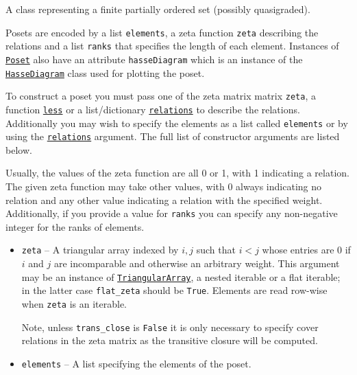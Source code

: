 \documentclass[12pt]{article}
\begin{document}
{\list{}{\leftmargin 0.5cm}\item{
A class representing a finite partially ordered set (possibly quasigraded).

Posets are encoded by a list \verb|elements|, a zeta
function \verb|zeta| describing the relations and a
list \verb|ranks| that specifies the length of each element.
Instances of \hyperlink{Poset}{\texttt{Poset}} also
have an attribute \verb|hasseDiagram| which is an instance
of the \hyperlink{HasseDiagram}{\texttt{HasseDiagram}} class used for plotting the poset.

To construct a poset you must pass one of the zeta matrix
matrix \verb|zeta|, a function \hyperlink{Poset.less}{\texttt{less}} or a list/dictionary
\hyperlink{Poset.relations}{\texttt{relations}} to describe
the relations. Additionally you may wish to specify the
elements as a list called \verb|elements| or by using
the \hyperlink{Poset.relations}{\texttt{relations}} argument. The full list of constructor
arguments are listed below.

Usually, the values of the zeta function are all 0 or 1,
with 1 indicating a relation. The given zeta function may
take other values, with 0 always indicating no relation
and any other value indicating a relation with the
specified weight. Additionally, if you provide a value
for \verb|ranks| you can specify any non-negative integer for
the ranks of elements.

\begin{itemize}
        \item[]{
        \verb|zeta| -- A triangular array indexed by $i,j$ such
        that $i<j$ whose entries are 0 if $i$ and $j$ are
        incomparable and otherwise an arbitrary weight. This
        argument may be an instance of \hyperlink{TriangularArray}{\texttt{TriangularArray}},
        a nested iterable or a flat iterable; in the latter case
        \verb|flat_zeta| should be \verb|True|. Elements are
        read row-wise when \verb|zeta| is an iterable.

        Note, unless \verb|trans_close| is \verb|False|
        it is only necessary to specify cover relations in the
        zeta matrix as the transitive closure will be computed.
        }
        \item[]{
        \verb|elements| -- A list specifying the elements of the poset.

}
\end{itemize}}}
\end{document}
